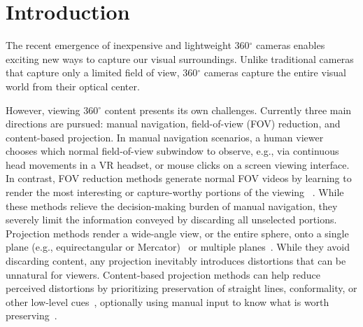 \section{Introduction}\label{sec:introduction}


The recent emergence of inexpensive and lightweight 360$^{\circ}$ cameras enables exciting new ways to capture our visual surroundings.
Unlike traditional cameras that capture only a limited field of view, 360$^{\circ}$ cameras capture the entire visual world from their optical center.  %


However, viewing 360$^{\circ}$ content presents its own challenges.  
Currently three main directions are pursued: manual navigation, field-of-view (FOV) reduction, and content-based projection.
In manual navigation scenarios, a human viewer chooses which normal field-of-view subwindow to observe, e.g., via continuous head movements in a VR headset, or mouse clicks on a screen viewing interface.  
In contrast, FOV reduction methods generate normal FOV videos by learning to render the most interesting or capture-worthy portions of the viewing ~\cite{su2016pano2vid,su2017making,hu2017deep,lai2017semantic}.  While these methods relieve the decision-making burden of manual navigation, they severely limit the information conveyed by discarding all unselected portions.  
Projection methods render a wide-angle view, or the entire sphere, onto a single plane (e.g., equirectangular or Mercator)~\cite{snyder1997flattening} or multiple planes~\cite{greene1986environment}.  While they avoid discarding content, any projection inevitably introduces distortions that can be unnatural for viewers.  Content-based projection methods can help reduce perceived distortions by prioritizing preservation of straight lines, conformality, or other low-level cues~\cite{sharpless2010pannini,kim2017automatic,li2015geodesic}, optionally using manual input to know what is worth preserving~\cite{carroll2009optimizing,tehrani2016correcting,carroll2010image,kopf2009locally,wang2015panorama}.




